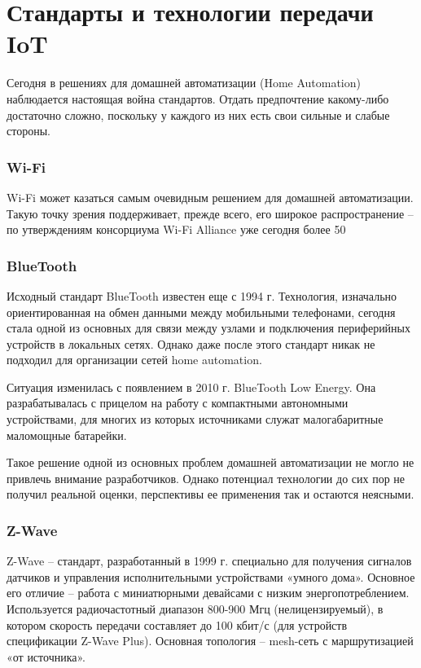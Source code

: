 \documentclass[a4paper,14pt]{extarticle}
\begin{document}
\section {Стандарты и технологии передачи IoT}

Сегодня в решениях для домашней автоматизации (Home Automation) наблюдается настоящая война стандартов. Отдать предпочтение какому-либо достаточно сложно, поскольку у каждого из них есть свои сильные и слабые стороны.
\subsubsection*{Wi-Fi}
Wi-Fi может казаться самым очевидным решением для домашней автоматизации. Такую точку зрения поддерживает, прежде всего, его широкое распространение – по утверждениям консорциума Wi-Fi Alliance уже сегодня более 50%
\subsubsection*{BlueTooth}
Исходный стандарт BlueTooth известен еще с 1994 г. Технология, изначально ориентированная на обмен данными между мобильными телефонами, сегодня стала одной из основных для связи между узлами и подключения периферийных устройств в локальных сетях. Однако даже после этого стандарт никак не подходил для организации сетей home automation.

Ситуация изменилась с появлением в 2010 г. BlueTooth Low Energy. Она разрабатывалась с прицелом на работу с компактными автономными устройствами, для многих из которых источниками служат малогабаритные маломощные батарейки.

Такое решение одной из основных проблем домашней автоматизации не могло не привлечь внимание разработчиков. Однако потенциал технологии до сих пор не получил реальной оценки, перспективы ее применения так и остаются неясными.
\subsubsection*{Z-Wave}
Z-Wave – стандарт, разработанный в 1999 г. специально для получения сигналов датчиков и управления исполнительными устройствами «умного дома». Основное его отличие – работа с миниатюрными девайсами с низким энергопотреблением. Используется радиочастотный диапазон 800-900 Мгц (нелицензируемый), в котором скорость передачи составляет до 100 кбит/с (для устройств спецификации Z-Wave Plus). Основная топология – mesh-сеть с маршрутизацией «от источника».
\end{document}
